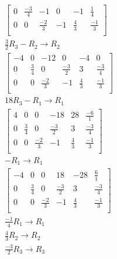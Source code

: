 \documentclass[12pt letter]{report}
\begin{document}
{{\begin{align*}
\begin{bmatrix}
        0  & \frac{-3}{4} & -1           & 0  & -1          & \frac{1}{4}  \\
        0  & 0            & \frac{-2}{3} & -1 & \frac{4}{3} & \frac{-1}{3} \\
      \end{bmatrix}
      \\
      \frac{3}{2}R_3 - R_2  \rightarrow R_2                        \\
      \begin{bmatrix}
        -4 & 0           & -12          & 0            & -4          & 0            \\
        0  & \frac{3}{4} & 0            & \frac{-3}{2} & 3           & \frac{-3}{4} \\
        0  & 0           & \frac{-2}{3} & -1           & \frac{4}{3} & \frac{-1}{3} \\
      \end{bmatrix}
      \\
      18R_3 - R_1  \rightarrow R_1                                 \\
      \begin{bmatrix}
        4 & 0           & 0            & -18          & 28          & \frac{-6}{1} \\
        0 & \frac{3}{4} & 0            & \frac{-3}{2} & 3           & \frac{-3}{4} \\
        0 & 0           & \frac{-2}{3} & -1           & \frac{4}{3} & \frac{-1}{3} \\
      \end{bmatrix}
      \\
      - R_1  \rightarrow R_1                                       \\
      \begin{bmatrix}
        -4 & 0           & 0            & 18           & -28         & \frac{6}{1}  \\
        0  & \frac{3}{4} & 0            & \frac{-3}{2} & 3           & \frac{-3}{4} \\
        0  & 0           & \frac{-2}{3} & -1           & \frac{4}{3} & \frac{-1}{3} \\
      \end{bmatrix}
      \\
      \frac{-1}{4}R_1 \to R_1                                      \\
      \frac{4}{3}R_2 \to R_2                                       \\
      \frac{-3}{2}R_3 \to R_3                                      \\

\end{align*}}}
\end{document}
